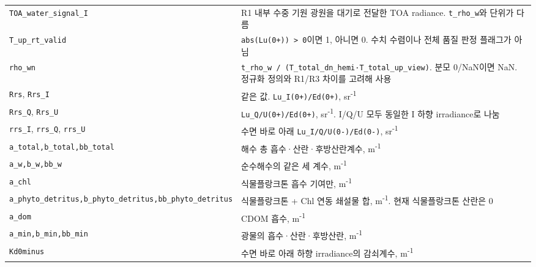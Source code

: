 {\begin{longtable}{@{}>{\raggedright\arraybackslash}p{}>{\raggedright\arraybackslash}p{}@{}}
\texttt{TOA\_\allowbreak{}water\_\allowbreak{}signal\_\allowbreak{}I} & R1 내부 수중 기원 광원을 대기로 전달한 TOA radiance. \texttt{t\_\allowbreak{}rho\_\allowbreak{}w}와 단위가 다름 \\
\texttt{T\_\allowbreak{}up\_\allowbreak{}rt\_\allowbreak{}valid} & \texttt{abs(Lu(0+)) > 0}이면 1, 아니면 0. 수치 수렴이나 전체 품질 판정 플래그가 아님 \\
\texttt{rho\_\allowbreak{}wn} & \texttt{t\_\allowbreak{}rho\_\allowbreak{}w /\allowbreak{} (T\_\allowbreak{}total\_\allowbreak{}dn\_\allowbreak{}hemi·T\_\allowbreak{}total\_\allowbreak{}up\_\allowbreak{}view)}. 분모 0/NaN이면 NaN. 정규화 정의와 R1/R3 차이를 고려해 사용 \\
\texttt{Rrs}, \texttt{Rrs\_\allowbreak{}I} & 같은 값. \texttt{Lu\_\allowbreak{}I(0+)/\allowbreak{}Ed(0+)}, sr\textsuperscript{-}\textsuperscript{1} \\
\texttt{Rrs\_\allowbreak{}Q}, \texttt{Rrs\_\allowbreak{}U} & \texttt{Lu\_\allowbreak{}Q/\allowbreak{}U(0+)/\allowbreak{}Ed(0+)}, sr\textsuperscript{-}\textsuperscript{1}. I/Q/U 모두 동일한 I 하향 irradiance로 나눔 \\
\texttt{rrs\_\allowbreak{}I}, \texttt{rrs\_\allowbreak{}Q}, \texttt{rrs\_\allowbreak{}U} & 수면 바로 아래 \texttt{Lu\_\allowbreak{}I/\allowbreak{}Q/\allowbreak{}U(0-)/\allowbreak{}Ed(0-)}, sr\textsuperscript{-}\textsuperscript{1} \\
\texttt{a\_\allowbreak{}total,\allowbreak{}b\_\allowbreak{}total,\allowbreak{}bb\_\allowbreak{}total} & 해수 총 흡수·산란·후방산란계수, m\textsuperscript{-}\textsuperscript{1} \\
\texttt{a\_\allowbreak{}w,\allowbreak{}b\_\allowbreak{}w,\allowbreak{}bb\_\allowbreak{}w} & 순수해수의 같은 세 계수, m\textsuperscript{-}\textsuperscript{1} \\
\texttt{a\_\allowbreak{}chl} & 식물플랑크톤 흡수 기여만, m\textsuperscript{-}\textsuperscript{1} \\
\texttt{a\_\allowbreak{}phyto\_\allowbreak{}detritus,\allowbreak{}b\_\allowbreak{}phyto\_\allowbreak{}detritus,\allowbreak{}bb\_\allowbreak{}phyto\_\allowbreak{}detritus} & 식물플랑크톤 + Chl 연동 쇄설물 합, m\textsuperscript{-}\textsuperscript{1}. 현재 식물플랑크톤 산란은 0 \\
\texttt{a\_\allowbreak{}dom} & CDOM 흡수, m\textsuperscript{-}\textsuperscript{1} \\
\texttt{a\_\allowbreak{}min,\allowbreak{}b\_\allowbreak{}min,\allowbreak{}bb\_\allowbreak{}min} & 광물의 흡수·산란·후방산란, m\textsuperscript{-}\textsuperscript{1} \\
\texttt{Kd0minus} & 수면 바로 아래 하향 irradiance의 감쇠계수, m\textsuperscript{-}\textsuperscript{1} \\
\end{longtable}
}

